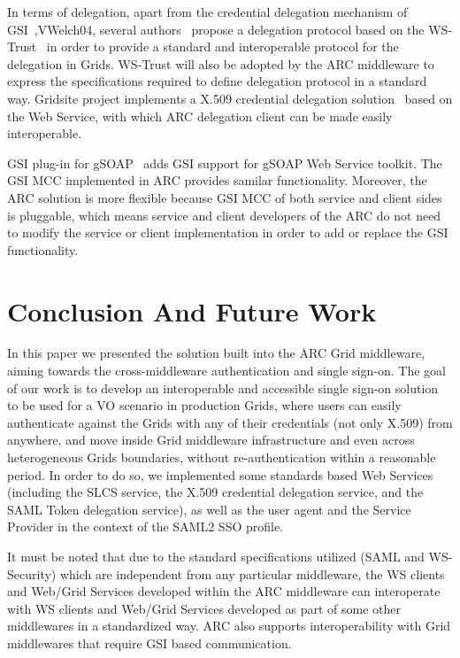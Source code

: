 \documentclass[twocolumn]{svjour3}         %
\begin{document}
In terms of delegation, apart from the credential delegation mechanism of GSI~\cite{IFoster98},{VWelch04}, several authors~\cite{MAhsant04} propose a delegation protocol based on the WS-Trust~\cite{WSTrustlink} in order to provide a standard and interoperable protocol for the delegation in Grids. WS-Trust will also be adopted by the ARC middleware to express the specifications required to define delegation protocol in a standard way. Gridsite project implements a X.509 credential delegation solution~\cite{GridSitelink} based on the Web Service, with which ARC delegation client can be made easily interoperable.

GSI plug-in for gSOAP~\cite{GAloisio05} adds GSI support for gSOAP Web Service toolkit. The GSI MCC implemented in ARC provides samilar functionality. Moreover, the ARC solution is more flexible because GSI MCC of both service and client sides is pluggable, which means service and client developers of the ARC do not need to modify the service or client implementation in order to add or replace the GSI functionality.



\section{Conclusion And Future Work}
\label{sec:conclusion}
In this paper we presented the solution built into the ARC Grid middleware, aiming towards the cross-middleware authentication and single sign-on. The goal of our work is to develop an interoperable and accessible single sign-on solution to be used for a VO scenario in production Grids, where users can easily authenticate against the Grids with any of their credentials (not only X.509) from anywhere, and move inside Grid middleware infrastructure and even across heterogeneous Grids  boundaries, without re-authentication within a reasonable period. In order to do so, we implemented some standards based Web Services (including the SLCS service, the X.509 credential delegation service, and the SAML Token delegation service), as well as the user agent and the Service Provider in the context of the SAML2 SSO profile.

It must be noted that due to the standard specifications utilized (SAML and WS-Security) which are independent from any particular middleware, the WS clients and Web/Grid Services developed within the ARC middleware can interoperate with WS clients and Web/Grid Services developed as part of some other middlewares in a standardized way. ARC also supports interoperability with Grid middlewares that require GSI based communication.
\end{document}
